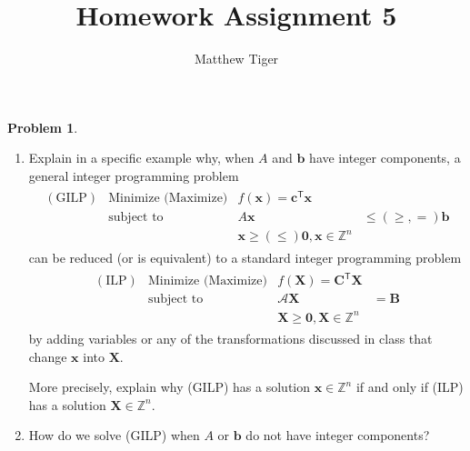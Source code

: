 \documentclass[12pt]{article}
\title{Homework Assignment 5}
\author{Matthew Tiger}
\theoremstyle{definition}
\newtheorem{problem}{Problem}
\newcommand{\vc}[1]{\boldsymbol{#1}}
\newcommand{\tran}{\mathsf{T}}
\begin{document}
\maketitle


\begin{problem}
  \begin{enumerate}
    \item Explain in a specific example why, when $A$ and $\vc{b}$ have integer
      components, a general integer programming problem
      \begin{align*}
        \begin{array}{rlrl}
          (\text{GILP}) & \text{Minimize (Maximize)} & f(\vc{x}) = \vc{c}^\tran \vc{x} & \\
          & \text{subject to} & A\vc{x} &\leq (\geq, =) \vc{b} \\
          & & \vc{x} \geq (\leq) \vc{0}, \vc{x}\in\mathbb{Z}^n
        \end{array}
      \end{align*}
      can be reduced (or is equivalent) to a standard integer programming problem
      \begin{align*}
        \begin{array}{rlrl}
          (\text{ILP}) & \text{Minimize (Maximize)} & f(\vc{X}) = \vc{C}^\tran\vc{X}& \\
          & \text{subject to} & \mathscr{A}\vc{X} &= \vc{B} \\
          && \vc{X} \geq \vc{0}, \vc{X} \in \mathbb{Z}^n
        \end{array}
      \end{align*}
      by adding variables or any of the transformations discussed in class that change $\vc{x}$ into $\vc{X}$.

      More precisely, explain why (GILP) has a solution $\vc{x} \in \mathbb{Z}^n$ if and only if
      (ILP) has a solution $\vc{X} \in \mathbb{Z}^n$.
    \item How do we solve (GILP) when $A$ or $\vc{b}$ do not have integer components?
  \end{enumerate}
\end{problem}
\end{document}
